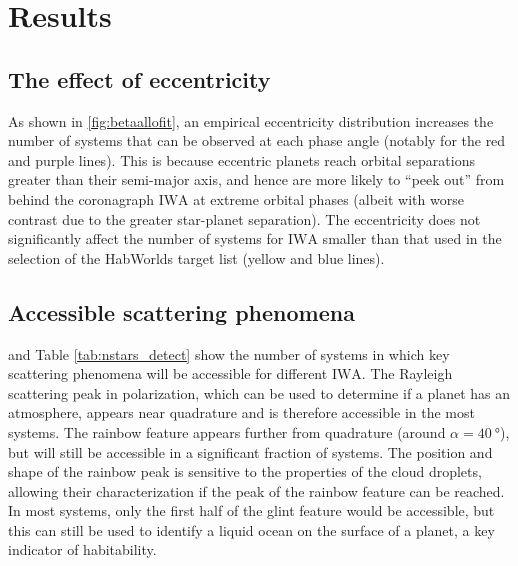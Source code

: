 \documentclass[usenatbib]{mnras}
\newcommand{\IWA}{\ensuremath{\mathrm{IWA}}\xspace}
\newcommand{\HWO}{HabWorlds\xspace}
\begin{document}

\vspace{-1mm}
\section{Results}
\label{sec:3}


\subsection{The effect of eccentricity}
\label{sec:result_eccentricity}

As shown in \cref{fig:betaallofit}, an empirical eccentricity distribution increases the number of systems that can be observed at each phase angle (notably for the red and purple lines). 
%
This is because eccentric planets reach orbital separations greater than their semi-major axis, and hence are more likely to \enquote{peek out} from behind the coronagraph \IWA at extreme orbital phases (albeit with worse contrast due to the greater star-planet separation). 
%
The eccentricity does not significantly affect the number of systems for \IWA smaller than that used in the selection of the \HWO target list (yellow and blue lines). 

\subsection{Accessible scattering phenomena}

 and Table \ref{tab:nstars_detect} show the number of systems in which key scattering phenomena will be accessible for different \IWA.
%
The Rayleigh scattering peak in polarization, which can be used to determine if a planet has an atmosphere, appears near quadrature and is therefore accessible in the most systems.
The rainbow feature appears further from quadrature (around $\alpha=\qty{40}{\degree}$), but will still be accessible in a significant fraction of systems.
%
The position and shape of the rainbow peak is sensitive to the properties of the cloud droplets, allowing their characterization if the peak of the rainbow feature can be reached.
%
In most systems, only the first half of the glint feature would be accessible, but this can still be used to identify a liquid ocean on the surface of a planet, a key indicator of habitability. 
\end{document}
